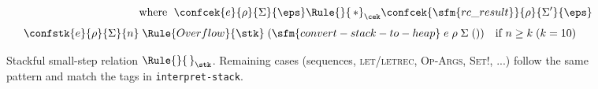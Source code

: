 \begin{figure}[!h]
{{\begin{minipage}{0.9\linewidth}
\begin{align*}
\\[2pt]
&  \text{where }\;
   \confcek{e}{\rho}{\Sigma}{\eps}
   \Rule{}{\,*}_{\cek}
   \confcek{\sfm{rc\_result}}{\rho}{\Sigma'}{\eps}
\\[4pt]
\confstk{e}{\rho}{\Sigma}{n}
  &\;\Rule{Overflow}{\stk}\;
(\sfm{convert-stack-to-heap}\;e\;\rho\;\Sigma\;())
\quad\text{if }n\ge k\;(k=10)
        \end{align*}
      \end{minipage}}}
  \caption{Stackful small-step relation \(\Rule{}{\,}_{\stk}\).
  Remaining cases (sequences, \textsc{let/letrec}, \textsc{Op-Args},
  \textsc{Set!}, ...) follow the same pattern and match the tags in
  \texttt{interpret-stack}.}
  \label{fig:stackrel}
\end{figure}

